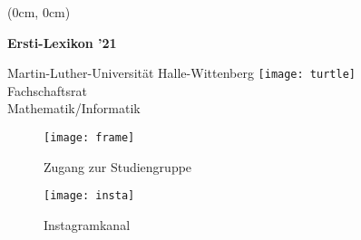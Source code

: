 \thispagestyle{empty}
\pagecolor{coverbackground}
\color{coverforeground}
{
    \setlength{\parindent}{0pt}
    \sffamily
    \begin{textblock*}{\textwidth}(0cm, 0cm)%
        \begin{sideways}
            \begin{minipage}{\textheight}
                \fontsize{1.5cm}{1.5cm}\selectfont%
                \bfseries
                \hspace{-0.1em}
                Ersti-Lexikon ’21
                \hfill
            \end{minipage}
        \end{sideways}%
    \end{textblock*}
    {
        \fontsize{0.45cm}{0.45cm}\selectfont
        Martin-Luther-Universität \hfill
        Halle-Wittenberg
    }
    \vfill
    \texttt{[image: turtle]} \\[0.5cm]
    {%
        \fontsize{0.675cm}{0.675cm}\selectfont
        Fachschaftsrat \\[0.5ex]
        Mathematik/Informatik
    }%
}%
\newpage
\restoregeometry
\nopagecolor
\color{black}
\begin{minipage}[h]{0.5\textwidth}
    \begin{figure}[H]
        \texttt{[image: frame]}
        \caption{Zugang zur Studiengruppe}
    \end{figure}
\end{minipage}\hspace{1mm}
\begin{minipage}[h]{0.5\textwidth}
    \begin{figure}[H]
        \texttt{[image: insta]}
        \caption{Instagramkanal}
    \end{figure}
\end{minipage}


\thispagestyle{empty}

